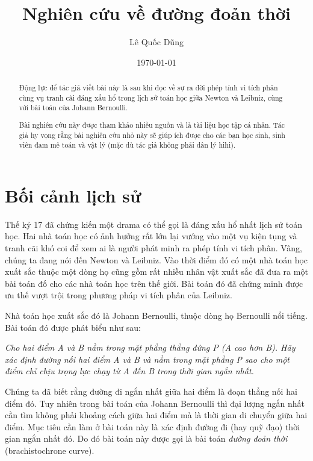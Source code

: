 \documentclass{article}
\title{Nghiên cứu về đường đoản thời}
\author{Lê Quốc Dũng}
\date{\today}
\begin{document}
\maketitle


\begin{abstract}

Động lực để tác giả viết bài này là sau khi đọc về sự ra đời phép tính vi tích phân cùng vụ tranh cãi đáng xấu hổ trong lịch sử toán học giữa Newton và Leibniz, cùng với bài toán của Johann Bernoulli. 
		
Bài nghiên cứu này được tham khảo nhiều nguồn và là tài liệu học tập cá nhân. Tác giả hy vọng rằng bài nghiên cứu nhỏ này sẽ giúp ích được cho các bạn học sinh, sinh viên đam mê toán và vật lý (mặc dù tác giả không phải dân lý hihi).

\end{abstract}

\tableofcontents

\section{Bối cảnh lịch sử}

Thế kỷ 17 đã chứng kiến một drama có thể gọi là đáng xấu hổ nhất lịch sử toán học. Hai nhà toán học có ảnh hưởng rất lớn lại vướng vào một vụ kiện tụng và tranh cãi khó coi để xem ai là người phát minh ra phép tính vi tích phân. Vâng, chúng ta đang nói đến Newton và Leibniz. Vào thời điểm đó có một nhà toán học xuất sắc thuộc một dòng họ cũng gồm rất nhiều nhân vật xuất sắc đã đưa ra một bài toán đố cho các nhà toán học trên thế giới. Bài toán đó đã chứng minh được ưu thế vượt trội trong phương pháp vi tích phân của Leibniz.
	
Nhà toán học xuất sắc đó là Johann Bernoulli, thuộc dòng họ Bernoulli nổi tiếng. Bài toán đó được phát biểu như sau:
	
\textit{Cho hai điểm A và B nằm trong mặt phẳng thẳng đứng P (A cao hơn B). Hãy 
	xác định đường nối hai điểm A và B và nằm trong mặt phẳng P sao cho một 
	điểm chỉ chịu trọng lực chạy từ A đến B trong thời gian ngắn nhất.}

Chúng ta đã biết rằng đường đi ngắn nhất giữa hai điểm là đoạn thẳng nối hai điểm đó. Tuy nhiên trong bài toán của Johann Bernoulli thì đại lượng ngắn nhất cần tìm không phải khoảng cách giữa hai điểm mà là thời gian di chuyển giữa hai điểm. Mục tiêu cần làm ở bài toán này là xác định đường đi (hay quỹ đạo) thời gian ngắn nhất đó. Do đó bài toán này được gọi là bài toán \textit{đường đoản thời} (brachistochrone curve).
\end{document}
